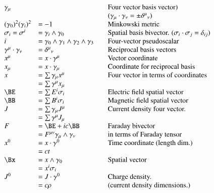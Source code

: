 \documentclass{article}
\begin{document}
\begin{equation*}\label{eqn:notation}
\begin{array}{l l l}
\gamma_{\mu} & & \quad \mbox{Four vector basis vector)} \\
& & \quad \mbox{($\gamma_{\mu} \cdot \gamma_{\nu} = \pm {\delta^{\mu}}_{\nu}$)} \\
{(\gamma_0)}^2 {(\gamma_i)}^2 &= -1 & \quad \mbox{Minkowski metric} \\
\sigma_i = \sigma^i &= \gamma_{i} \wedge \gamma_0 & \quad \mbox{Spatial basis bivector. ($\sigma_i \cdot \sigma_j = \delta_{ij}$)} \\
i &= \gamma_{0} \wedge \gamma_1 \wedge \gamma_{2} \wedge \gamma_3 & \quad \mbox{Four-vector pseudoscalar} \\
\gamma^{\mu} \cdot \gamma_{\nu} &= {\delta^{\mu}}_{\nu} & \quad \mbox{Reciprocal basis vectors} \\
x^{\mu} &= x \cdot \gamma^{\mu} & \quad \mbox{Vector coordinate} \\
x_{\mu} &= x \cdot \gamma_{\mu} & \quad \mbox{Coordinate for reciprocal basis} \\
x &= \sum \gamma_{\mu} x^{\mu} & \quad \mbox{Four vector in terms of coordinates} \\
  &= \sum \gamma^{\mu} x_{\mu} \\
\BE &= \sum E^i \sigma_i & \quad \mbox{Electric field spatial vector} \\
\BB &= \sum B^i \sigma_i & \quad \mbox{Magnetic field spatial vector} \\
J &= \sum \gamma_{\mu} J^{\mu} & \quad \mbox{Current density four vector.} \\
  &= \sum \gamma^{\mu} J_{\mu} \\
F &= \BE + i c \BB & \quad \mbox{Faraday bivector} \\
  &= F^{\mu\nu} \gamma_\mu \wedge \gamma_\nu & \quad \mbox{in terms of Faraday tensor} \\
x^{0} &= x \cdot \gamma^0 & \quad \mbox{Time coordinate (length dim.)} \\
      &= c t \\
\Bx &= x \wedge \gamma_0 & \quad \mbox{Spatial vector} \\
    &= x^i \sigma_i \\
J^{0} &= J \cdot \gamma^0 & \quad \mbox{Charge density.} \\
      &= c \rho & \quad \mbox{(current density dimensions.)} \\

\end{array}
\end{equation*}
\end{document}
